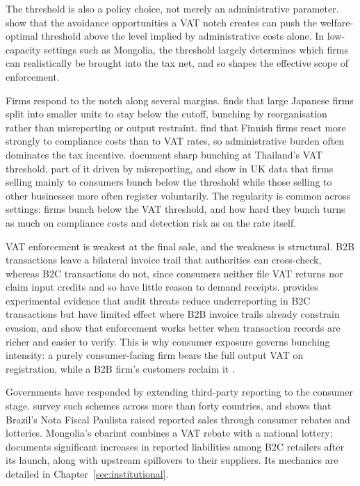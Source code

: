 \documentclass[12pt,oneside,a4paper]{report}
\begin{document}
The threshold is also a policy choice, not merely an administrative parameter. \textcite{kanbur2014thresholds} show that the avoidance opportunities a VAT notch creates can push the welfare-optimal threshold above the level implied by administrative costs alone. In low-capacity settings such as Mongolia, the threshold largely determines which firms can realistically be brought into the tax net, and so shapes the effective scope of enforcement.

Firms respond to the notch along several margins. \textcite{onji2009response} finds that large Japanese firms split into smaller units to stay below the cutoff, bunching by reorganisation rather than misreporting or output restraint. \textcite{harju2019compliance} find that Finnish firms react more strongly to compliance costs than to VAT rates, so administrative burden often dominates the tax incentive. \textcite{muthitacharoen2021vat} document sharp bunching at Thailand's VAT threshold, part of it driven by misreporting, and \textcite{liu2021vat} show in UK data that firms selling mainly to consumers bunch below the threshold while those selling to other businesses more often register voluntarily. The regularity is common across settings: firms bunch below the VAT threshold, and how hard they bunch turns as much on compliance costs and detection risk as on the rate itself.

VAT enforcement is weakest at the final sale, and the weakness is structural. B2B transactions leave a bilateral invoice trail that authorities can cross-check, whereas B2C transactions do not, since consumers neither file VAT returns nor claim input credits and so have little reason to demand receipts. \textcite{pomeranz2015no} provides experimental evidence that audit threats reduce underreporting in B2C transactions but have limited effect where B2B invoice trails already constrain evasion, and \textcite{almunia2018under} show that enforcement works better when transaction records are richer and easier to verify. This is why consumer exposure governs bunching intensity: a purely consumer-facing firm bears the full output VAT on registration, while a B2B firm's customers reclaim it \parencite{liu2021vat}.

Governments have responded by extending third-party reporting to the consumer stage. \textcite{naritomi2025enlisting} survey such schemes across more than forty countries, and \textcite{naritomi2019consumers} shows that Brazil's Nota Fiscal Paulista raised reported sales through consumer rebates and lotteries. Mongolia's ebarimt combines a VAT rebate with a national lottery; \textcite{nyamdavaa2023does} documents significant increases in reported liabilities among B2C retailers after its launch, along with upstream spillovers to their suppliers. Its mechanics are detailed in Chapter~\ref{sec:institutional}.
\end{document}
